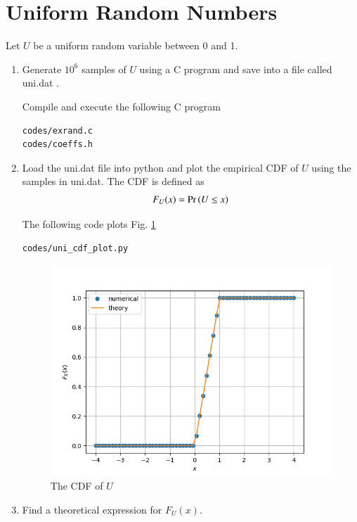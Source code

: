 \documentclass[journal,12pt,twocolumn]{IEEEtran}
\renewcommand\thesection{\arabic{section}}
\begin{document}
\section{Uniform Random Numbers}
Let $U$ be a uniform random variable between 0 and 1.
\begin{enumerate}[label=\thesection.\arabic*
,ref=\thesection.\theenumi]
\item Generate $10^6$ samples of $U$ using a C program and save into a file called uni.dat .

\solution Compile and execute the following C program
\begin{lstlisting}
codes/exrand.c
codes/coeffs.h
\end{lstlisting}

\item
Load the uni.dat file into python and plot the empirical CDF of $U$ using the samples in uni.dat. The CDF is defined as
\begin{align}
F_{U}(x) = \Pr\left(U \leq x\right)
\end{align}

\solution  The following code plots Fig. \ref{fig:uni_cdf}
\begin{lstlisting}
codes/uni_cdf_plot.py
\end{lstlisting}

\begin{figure}[h!]
\centering
\includegraphics[width=\columnwidth]{./figs/uni_cdf.png}
\caption{The CDF of $U$}
\label{fig:uni_cdf}
\end{figure}

%
\item
Find a theoretical expression for $F_{U}(x)$.


\end{enumerate}
\end{document}
